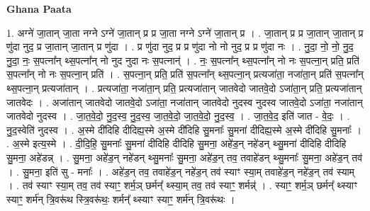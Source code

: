 \documentclass[17pt]{extarticle}
\begin{document}
\textbf{Ghana Paata } \newline

1. अग्ने॑ जा॒तान् जा॒ता नग्ने ऽग्ने॑ जा॒तान् प्र प्र जा॒ता नग्ने ऽग्ने॑ जा॒तान् प्र । . जा॒तान् प्र प्र जा॒तान् जा॒तान् प्र णु॑दा नुद॒ प्र जा॒तान् जा॒तान् प्र णु॑दा । . प्र णु॑दा नुद॒ प्र प्र णु॑दा नो नो नुद॒ प्र प्र णु॑दा नः । . नु॒दा॒ नो॒ नो॒ नु॒द॒ नु॒दा॒ नः॒ स॒पत्ना᳚न् थ्स॒पत्ना᳚न् नो नुद नुदा नः स॒पत्नान्॑ । . नः॒ स॒पत्ना᳚न् थ्स॒पत्ना᳚न् नो नः स॒पत्ना॒न् प्रति॒ प्रति॑ स॒पत्ना᳚न् नो नः स॒पत्ना॒न् प्रति॑ । . स॒पत्ना॒न् प्रति॒ प्रति॑ स॒पत्ना᳚न् थ्स॒पत्ना॒न् प्रत्यजा॑ता॒ नजा॑ता॒न् प्रति॑ स॒पत्ना᳚न् थ्स॒पत्ना॒न् प्रत्यजा॑तान् । . प्रत्यजा॑ता॒ नजा॑ता॒न् प्रति॒ प्रत्यजा॑तान् जातवेदो जातवे॒दो ऽजा॑ता॒न् प्रति॒ प्रत्यजा॑तान् जातवेदः । . अजा॑तान् जातवेदो जातवे॒दो ऽजा॑ता॒ नजा॑तान् जातवेदो नुदस्व नुदस्व जातवे॒दो ऽजा॑ता॒ नजा॑तान् जातवेदो नुदस्व । . जा॒त॒वे॒दो॒ नु॒द॒स्व॒ नु॒द॒स्व॒ जा॒त॒वे॒दो॒ जा॒त॒वे॒दो॒ नु॒द॒स्व॒ । . जा॒त॒वे॒द॒ इति॑ जात - वे॒दः॒ । . नु॒द॒स्वेति॑ नुदस्व । . अ॒स्मे दी॑दिहि दीदिह्य॒स्मे अ॒स्मे दी॑दिहि सु॒मनाः᳚ सु॒मना॑ दीदिह्य॒स्मे अ॒स्मे दी॑दिहि सु॒मनाः᳚ । . अ॒स्मे इत्य॒स्मे । . दी॒दि॒हि॒ सु॒मनाः᳚ सु॒मना॑ दीदिहि दीदिहि सु॒मना॒ अहे॑ड॒न् नहे॑डन् थ्सु॒मना॑ दीदिहि दीदिहि सु॒मना॒ अहे॑डन्न् । . सु॒मना॒ अहे॑ड॒न् नहे॑डन् थ्सु॒मनाः᳚ सु॒मना॒ अहे॑ड॒न् तव॒ तवाहे॑डन् थ्सु॒मनाः᳚ सु॒मना॒ अहे॑ड॒न् तव॑ । . सु॒मना॒ इति॑ सु - मनाः᳚ । . अहे॑ड॒न् तव॒ तवाहे॑ड॒न् नहे॑ड॒न् तव॑ स्याꣳ स्या॒म् तवाहे॑ड॒न् नहे॑ड॒न् तव॑ स्याम् । . तव॑ स्याꣳ स्या॒म् तव॒ तव॑ स्याꣳ॒॒ शर्म॒ञ् छर्मन्᳚ थ्स्या॒म् तव॒ तव॑ स्याꣳ॒॒ शर्मन्न्॑ । . स्याꣳ॒॒ शर्म॒ञ् छर्मन्᳚ थ्स्याꣳ स्याꣳ॒॒ शर्म॑न् त्रि॒वरू॑थ स्त्रि॒वरू॑थः॒ शर्मन्᳚ थ्स्याꣳ स्याꣳ॒॒ शर्म॑न् त्रि॒वरू॑थः । \newline
\end{document}
